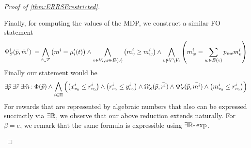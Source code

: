 \begin{proof}[Proof of \cref{thm:ERRSErestricted}]
\begin{claimproof}
\[                 \]     
    Finally, for computing the values of the MDP, we construct a similar FO statement
    \[\Psi_S^i(\Bar{p},\Bar{m}^i) \:= \bigwedge_{t\in T} \left( m^i =\mu_i'(t) \right) \land
                 \bigwedge_{v\in V_i, w\in E(v)} \left(m_v^i\geq m_w^i\right) \land
                 \bigwedge_{v\notin V\setminus V_i} \left( m^i_w = \sum_{w\in E(v)} p_{vw} m^i_v \right)\]
Finally our statement would be $$\exists \Bar{p}\:\exists\Bar{r}\:\exists\Bar{m}\colon \Phi(\Bar{p})\land \bigwedge_{i\in\Pi}\left(\left( x^i_{v_0}\leq r^i_{v_0} \right)\land \left( r^i_{v_0}\leq y^i_{v_0} \right)\land\Omega_S^i(\Bar{p},\Bar{r^i})\land \Psi_S^i(\Bar{p},\Bar{m^i})\land \left( m_{v_0}^i\leq r_{v_0}^i \right) \right)$$
For rewards that are represented by algebraic numbers that also can be expressed succinctly via $\exists\mathbb{R}$, we observe that our above reduction extends naturally. 
For $\beta = e$, we remark that the same formula is expressible using $\exists\mathbb{R}\text{-}\exp$.
    \end{claimproof}

\end{proof}
